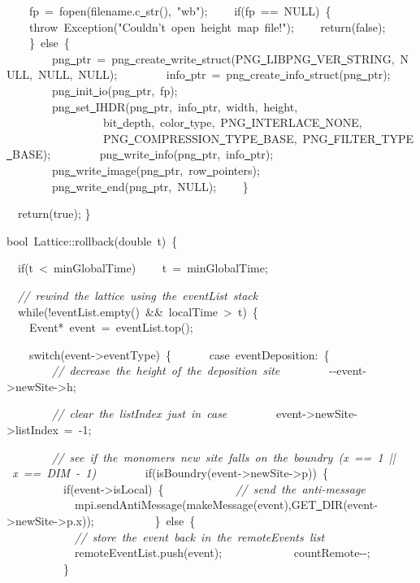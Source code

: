 {\ \ \ \ fp\ =\ fopen(filename.c\underline\ str(),\ "{}wb"{});
\ \ \ \ if(fp\ ==\ NULL)\ \{
\ \ \ \ throw\ Exception("{}Couldn't\ open\ height\ map\ file!"{});
\ \ \ \ return(false);
\ \ \ \ \}\ else\ \{
\ \ \ \ \ \ \ \ png\underline\ ptr\ =\ png\underline\ create\underline\ write\underline\ struct(PNG\underline\ LIBPNG\underline\ VER\underline\ STRING,\ NULL,\ NULL,\ NULL);
\ \ \ \ \ \ \ \ info\underline\ ptr\ =\ png\underline\ create\underline\ info\underline\ struct(png\underline\ ptr);
\ \ \ \ \ \ \ \ png\underline\ init\underline\ io(png\underline\ ptr,\ fp);
\ \ \ \ \ \ \ \ png\underline\ set\underline\ IHDR(png\underline\ ptr,\ info\underline\ ptr,\ width,\ height,
\ \ \ \ \ \ \ \ \ \ \ \ \ \ \ \ \ bit\underline\ depth,\ color\underline\ type,\ PNG\underline\ INTERLACE\underline\ NONE,
\ \ \ \ \ \ \ \ \ \ \ \ \ \ \ \ \ PNG\underline\ COMPRESSION\underline\ TYPE\underline\ BASE,\ PNG\underline\ FILTER\underline\ TYPE\underline\ BASE);
\ \ \ \ \ \ \ \ png\underline\ write\underline\ info(png\underline\ ptr,\ info\underline\ ptr);
\ \ \ \ \ \ \ \ png\underline\ write\underline\ image(png\underline\ ptr,\ row\underline\ pointers);
\ \ \ \ \ \ \ \ png\underline\ write\underline\ end(png\underline\ ptr,\ NULL);
\ \ \ \ \}

\ \ return(true);
\}

bool\ Lattice::rollback(double\ t)\ \{

\ \ if(t\ <{}\ minGlobalTime)
\ \ \ \ t\ =\ minGlobalTime;

\ \ \textsl{//\ rewind\ the\ lattice\ using\ the\ eventList\ stack}
\ \ while(!eventList.empty()\ \&\&\ localTime\ >{}\ t)\ \{
\ \ \ \ Event*\ event\ =\ eventList.top();

\ \ \ \ switch(event-{}>{}eventType)\ \{
\ \ \ \ \ \ case\ eventDeposition:\ \{
\ \ \ \ \ \ \ \ \textsl{//\ decrease\ the\ height\ of\ the\ deposition\ site}
\ \ \ \ \ \ \ \ -{}-{}event-{}>{}newSite-{}>{}h;

\ \ \ \ \ \ \ \ \textsl{//\ clear\ the\ listIndex\ just\ in\ case}
\ \ \ \ \ \ \ \ event-{}>{}newSite-{}>{}listIndex\ =\ -{}1;

\ \ \ \ \ \ \ \ \textsl{//\ see\ if\ the\ monomers\ new\ site\ falls\ on\ the\ boundry\ (x\ ==\ 1\ ||\ x\ ==\ DIM\ -{}\ 1)}
\ \ \ \ \ \ \ \ if(isBoundry(event-{}>{}newSite-{}>{}p))\ \{
\ \ \ \ \ \ \ \ \ \ if(event-{}>{}isLocal)\ \{
\ \ \ \ \ \ \ \ \ \ \ \ \textsl{//\ send\ the\ anti-{}message}
\ \ \ \ \ \ \ \ \ \ \ \ mpi.sendAntiMessage(makeMessage(event),GET\underline\ DIR(event-{}>{}newSite-{}>{}p.x));
\ \ \ \ \ \ \ \ \ \ \}\ else\ \{
\ \ \ \ \ \ \ \ \ \ \ \ \textsl{//\ store\ the\ event\ back\ in\ the\ remoteEvents\ list}
\ \ \ \ \ \ \ \ \ \ \ \ remoteEventList.push(event);
\ \ \ \ \ \ \ \ \ \ \ \ countRemote-{}-{};
\ \ \ \ \ \ \ \ \ \ \}

}
